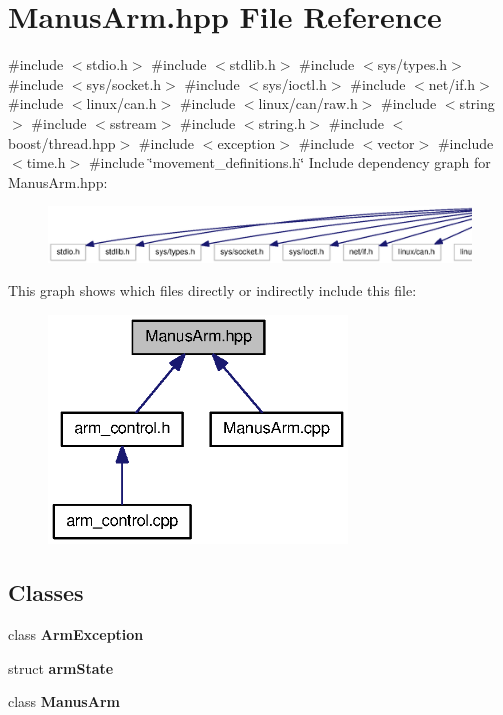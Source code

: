 \section{\-Manus\-Arm.\-hpp \-File \-Reference}
\label{ManusArm_8hpp}
{\ttfamily \#include $<$stdio.\-h$>$}\*
{\ttfamily \#include $<$stdlib.\-h$>$}\*
{\ttfamily \#include $<$sys/types.\-h$>$}\*
{\ttfamily \#include $<$sys/socket.\-h$>$}\*
{\ttfamily \#include $<$sys/ioctl.\-h$>$}\*
{\ttfamily \#include $<$net/if.\-h$>$}\*
{\ttfamily \#include $<$linux/can.\-h$>$}\*
{\ttfamily \#include $<$linux/can/raw.\-h$>$}\*
{\ttfamily \#include $<$string$>$}\*
{\ttfamily \#include $<$sstream$>$}\*
{\ttfamily \#include $<$string.\-h$>$}\*
{\ttfamily \#include $<$boost/thread.\-hpp$>$}\*
{\ttfamily \#include $<$exception$>$}\*
{\ttfamily \#include $<$vector$>$}\*
{\ttfamily \#include $<$time.\-h$>$}\*
{\ttfamily \#include \char`\"{}movement\-\_\-definitions.\-h\char`\"{}}\*
\-Include dependency graph for \-Manus\-Arm.\-hpp\-:\nopagebreak
\begin{figure}[H]
\begin{center}
\leavevmode
\includegraphics[width=350pt]{ManusArm_8hpp__incl}
\end{center}
\end{figure}
\-This graph shows which files directly or indirectly include this file\-:\nopagebreak
\begin{figure}[H]
\begin{center}
\leavevmode
\includegraphics[width=225pt]{ManusArm_8hpp__dep__incl}
\end{center}
\end{figure}
\subsection*{\-Classes}
\begin{DoxyCompactItemize}
\item 
class {\bf \-Arm\-Exception}
\item 
struct {\bf arm\-State}
\item 
class {\bf \-Manus\-Arm}
\end{DoxyCompactItemize}

